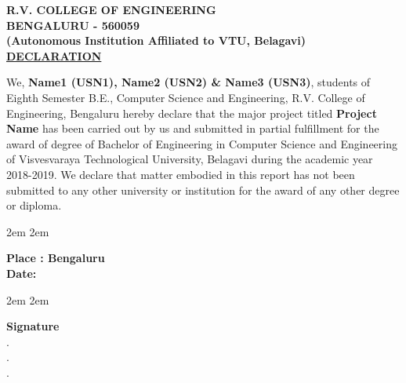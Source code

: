 \newpage


\begin{center}
	\textbf {
		\large R.V. COLLEGE OF ENGINEERING \\
		\large BENGALURU - 560059\\
		\small(Autonomous Institution Affiliated to VTU, Belagavi)\\[1cm]
	}
	\Large \textbf{\underline {DECLARATION}}\\[1cm]
\end{center}
\linespread{1.5}\normalsize \begin{center} \justify
We, \textbf{Name1 (USN1), Name2 (USN2) \& Name3 (USN3)}, students of Eighth Semester B.E., Computer Science and
Engineering, R.V. College of Engineering, Bengaluru hereby declare that the major
project titled \textbf{Project Name} has been carried out by us and submitted in partial
fulfillment for the award of degree of Bachelor of Engineering in Computer Science
and Engineering of Visvesvaraya Technological University, Belagavi during the
academic year 2018-2019. We declare that matter embodied in this report has not been submitted to any other university or institution for the award of any other degree or diploma.
\end{center}
\linespread{1}

\begin{multicols}{2}

	\begin{center}
		\begingroup
			\leftskip2em
			\rightskip2em

			\normalsize \textbf{Place : Bengaluru} \\
			\medskip
			\textbf{Date: }\hrulefill\\
		\endgroup
	\end{center}

	\columnbreak

	\begin{center}
		\begingroup
			\leftskip2em
			\rightskip2em

			\textbf{Signature}\\
			. \hrulefill\\
			. \hrulefill\\
			. \hrulefill\\
		\endgroup
	\end{center}


\end{multicols}

